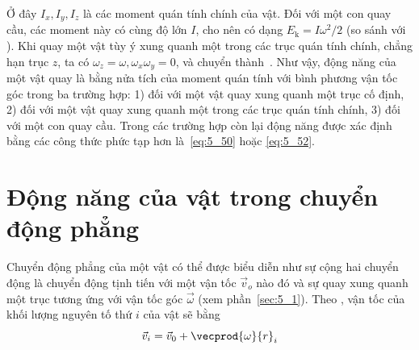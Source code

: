 \noindent
Ở đây $I_x, I_y, I_z$ là các moment quán tính chính của vật. Đối với một con quay cầu, các moment này có cùng độ lớn $I$, cho nên  có dạng $E_{\text{k}}=I\omega^2/2$ (so sánh với ). Khi quay một vật tùy ý xung quanh một trong các trục quán tính chính, chẳng hạn trục $z$, ta có $\omega_z=\omega, \omega_x\omega_y=0$, và  chuyển thành~.
Như vậy, động năng của một vật quay là bằng nửa tích của moment quán tính với bình phương vận tốc góc trong ba trường hợp: 1) đối với một vật quay xung quanh một trục cố định, 2) đối với một vật quay xung quanh một trong các trục quán tính chính, 3) đối với một con quay cầu. Trong các trường hợp còn lại động năng được xác định bằng các công thức phức tạp hơn là~\eqref{eq:5_50} hoặc \eqref{eq:5_52}.

\section{Động năng của vật trong chuyển động phẳng}\label{sec:5_7}

\vspace{-5pt}

Chuyển động phẳng của một vật có thể được biểu diễn như sự cộng hai chuyển động là chuyển động tịnh tiến với một vận tốc $\vec{v}_o$ nào đó và sự quay xung quanh một trục tương ứng với vận tốc góc $\vec{\omega}$ (xem phần~\ref{sec:5_1}). Theo , vận tốc của khối lượng nguyên tố thứ $i$ của vật sẽ bằng
\begin{equation*}
	\vec{v}_i = \vec{v}_0 + \vecprod{\omega}{r}_i
\end{equation*}

